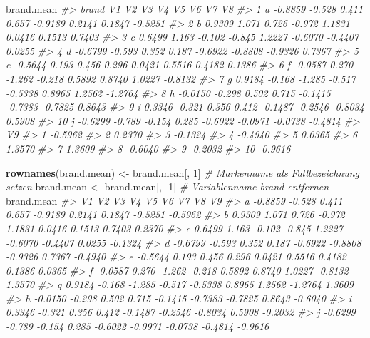 \documentclass[12pt,]{book}
\makeatletter
\newenvironment{Shaded}{\begin{snugshade}}{\end{snugshade}}
\newcommand{\KeywordTok}[1]{\textcolor[rgb]{0.13,0.29,0.53}{\textbf{{#1}}}}
\newcommand{\DecValTok}[1]{\textcolor[rgb]{0.00,0.00,0.81}{{#1}}}
\newcommand{\StringTok}[1]{\textcolor[rgb]{0.31,0.60,0.02}{{#1}}}
\newcommand{\CommentTok}[1]{\textcolor[rgb]{0.56,0.35,0.01}{\textit{{#1}}}}
\newcommand{\NormalTok}[1]{{#1}}
\newenvironment{kframe}{%
\medskip{}
\setlength{\fboxsep}{.8em}
 \def\at@end@of@kframe{}%
 \ifinner\ifhmode%
  \def\at@end@of@kframe{\end{minipage}}%
  \begin{minipage}{\columnwidth}%
 \fi\fi%
 \def\FrameCommand##1{\hskip\@totalleftmargin \hskip-\fboxsep
 \colorbox{shadecolor}{##1}\hskip-\fboxsep
     \hskip-\linewidth \hskip-\@totalleftmargin \hskip\columnwidth}%
 \MakeFramed {\advance\hsize-\width
   \@totalleftmargin\z@ \linewidth\hsize
   \@setminipage}}%
 {\par\unskip\endMakeFramed%
 \at@end@of@kframe}
\renewenvironment{Shaded}{\begin{kframe}}{\end{kframe}}
\makeatother
\begin{document}
\begin{Shaded}
\begin{Highlighting}[]
\NormalTok{brand.mean}
\CommentTok{#>    brand      V1     V2     V3     V4      V5      V6      V7      V8}
\CommentTok{#> 1      a -0.8859 -0.528  0.411  0.657 -0.9189  0.2141  0.1847 -0.5251}
\CommentTok{#> 2      b  0.9309  1.071  0.726 -0.972  1.1831  0.0416  0.1513  0.7403}
\CommentTok{#> 3      c  0.6499  1.163 -0.102 -0.845  1.2227 -0.6070 -0.4407  0.0255}
\CommentTok{#> 4      d -0.6799 -0.593  0.352  0.187 -0.6922 -0.8808 -0.9326  0.7367}
\CommentTok{#> 5      e -0.5644  0.193  0.456  0.296  0.0421  0.5516  0.4182  0.1386}
\CommentTok{#> 6      f -0.0587  0.270 -1.262 -0.218  0.5892  0.8740  1.0227 -0.8132}
\CommentTok{#> 7      g  0.9184 -0.168 -1.285 -0.517 -0.5338  0.8965  1.2562 -1.2764}
\CommentTok{#> 8      h -0.0150 -0.298  0.502  0.715 -0.1415 -0.7383 -0.7825  0.8643}
\CommentTok{#> 9      i  0.3346 -0.321  0.356  0.412 -0.1487 -0.2546 -0.8034  0.5908}
\CommentTok{#> 10     j -0.6299 -0.789 -0.154  0.285 -0.6022 -0.0971 -0.0738 -0.4814}
\CommentTok{#>         V9}
\CommentTok{#> 1  -0.5962}
\CommentTok{#> 2   0.2370}
\CommentTok{#> 3  -0.1324}
\CommentTok{#> 4  -0.4940}
\CommentTok{#> 5   0.0365}
\CommentTok{#> 6   1.3570}
\CommentTok{#> 7   1.3609}
\CommentTok{#> 8  -0.6040}
\CommentTok{#> 9  -0.2032}
\CommentTok{#> 10 -0.9616}

\KeywordTok{rownames}\NormalTok{(brand.mean) <-}\StringTok{ }\NormalTok{brand.mean[, }\DecValTok{1}\NormalTok{] }\CommentTok{# Markenname als Fallbezeichnung setzen}
\NormalTok{brand.mean <-}\StringTok{ }\NormalTok{brand.mean[, -}\DecValTok{1}\NormalTok{]          }\CommentTok{# Variablenname brand entfernen}
\NormalTok{brand.mean}
\CommentTok{#>        V1     V2     V3     V4      V5      V6      V7      V8      V9}
\CommentTok{#> a -0.8859 -0.528  0.411  0.657 -0.9189  0.2141  0.1847 -0.5251 -0.5962}
\CommentTok{#> b  0.9309  1.071  0.726 -0.972  1.1831  0.0416  0.1513  0.7403  0.2370}
\CommentTok{#> c  0.6499  1.163 -0.102 -0.845  1.2227 -0.6070 -0.4407  0.0255 -0.1324}
\CommentTok{#> d -0.6799 -0.593  0.352  0.187 -0.6922 -0.8808 -0.9326  0.7367 -0.4940}
\CommentTok{#> e -0.5644  0.193  0.456  0.296  0.0421  0.5516  0.4182  0.1386  0.0365}
\CommentTok{#> f -0.0587  0.270 -1.262 -0.218  0.5892  0.8740  1.0227 -0.8132  1.3570}
\CommentTok{#> g  0.9184 -0.168 -1.285 -0.517 -0.5338  0.8965  1.2562 -1.2764  1.3609}
\CommentTok{#> h -0.0150 -0.298  0.502  0.715 -0.1415 -0.7383 -0.7825  0.8643 -0.6040}
\CommentTok{#> i  0.3346 -0.321  0.356  0.412 -0.1487 -0.2546 -0.8034  0.5908 -0.2032}
\CommentTok{#> j -0.6299 -0.789 -0.154  0.285 -0.6022 -0.0971 -0.0738 -0.4814 -0.9616}
\end{Highlighting}
\end{Shaded}
\end{document}
